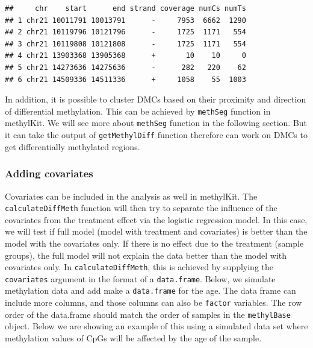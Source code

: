 \documentclass[12pt,]{krantz}
\begin{document}
\begin{verbatim}
##     chr    start      end strand coverage numCs numTs
## 1 chr21 10011791 10013791      -     7953  6662  1290
## 2 chr21 10119796 10121796      -     1725  1171   554
## 3 chr21 10119808 10121808      -     1725  1171   554
## 4 chr21 13903368 13905368      +       10    10     0
## 5 chr21 14273636 14275636      -      282   220    62
## 6 chr21 14509336 14511336      +     1058    55  1003
\end{verbatim}

In addition, it is possible to cluster DMCs based on their proximity and direction of differential methylation. This can be achieved by \texttt{methSeg} function in methylKit. We will see more about \texttt{methSeg} function in the following section.
But it can take the output of \texttt{getMethylDiff} function therefore can work on DMCs to get differentially methylated regions.

\hypertarget{adding-covariates}{%
\subsubsection{Adding covariates}\label{adding-covariates}}

Covariates can be included in the analysis as well in methylKit. The \texttt{calculateDiffMeth} function will then try to
separate the influence of the covariates from the
treatment effect via the logistic regression model. In this case, we will test
if full model (model with treatment and covariates) is better than the model with
the covariates only. If there is no effect due to the treatment (sample groups),
the full model will not explain the data better than the model with covariates
only. In \texttt{calculateDiffMeth}, this is achieved by
supplying the \texttt{covariates} argument in the format of a \texttt{data.frame}.
Below, we simulate methylation data and add make a \texttt{data.frame} for the age.
The data frame can include more columns, and those columns can also be
\texttt{factor} variables. The row order of the data.frame should match the order
of samples in the \texttt{methylBase} object. Below we are showing an example
of this using a simulated data set where methylation values of CpGs will be affected by the age of the sample.
\end{document}
